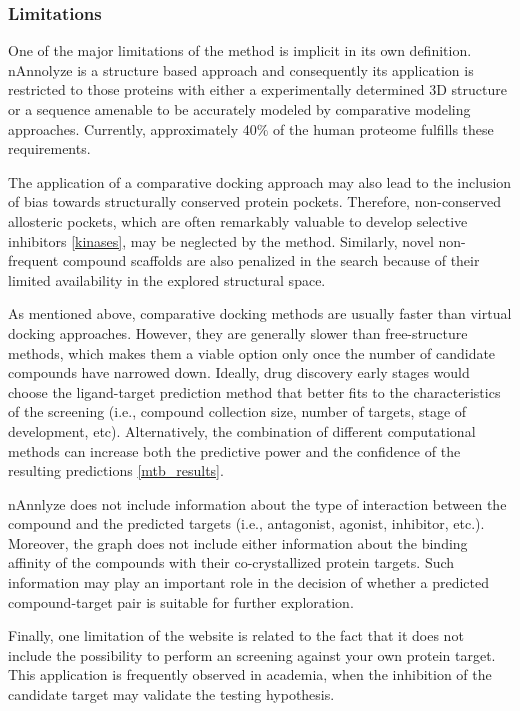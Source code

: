 \documentclass[11pt, b5paper,twoside]{tesi_upf}
\begin{document}
\subsubsection{Limitations}
 \par One of the major limitations of the method is implicit in its own definition. nAnnolyze is a structure based approach and consequently its application is restricted to those proteins with either a experimentally determined 3D structure or a sequence amenable to be accurately modeled by comparative modeling approaches. Currently, approximately 40$\%$ of the human proteome fulfills these requirements.
 \par The application of a comparative docking approach may also lead to the inclusion of bias towards structurally conserved protein pockets. Therefore, non-conserved allosteric pockets, which are often remarkably valuable to develop selective inhibitors \ref{kinases}, may be neglected by the method. Similarly, novel non-frequent compound scaffolds are also penalized in the search because of their limited availability in the explored structural space. 
 \par As mentioned above, comparative docking methods are usually faster than virtual docking approaches. However, they are generally slower than free-structure methods, which makes them a viable option only once the number of candidate compounds have narrowed down. Ideally, drug discovery early stages would choose the ligand-target prediction method that better fits to the characteristics of the screening (i.e., compound collection size, number of targets, stage of development, etc). Alternatively, the combination of different computational methods can increase both the predictive power and the confidence of the resulting predictions \ref{mtb_results}. 
 \par nAnnlyze does not include information about the type of interaction between the compound and the predicted targets (i.e., antagonist, agonist, inhibitor, etc.). Moreover, the graph does not include either information about the binding affinity of the compounds with their co-crystallized protein targets. Such information may play an important role in the decision of whether a predicted compound-target pair is suitable for further exploration. 
  
 \par Finally, one limitation of the website is related to the fact that it does not include the possibility to perform an screening against your own protein target. This application is frequently observed in academia, when the inhibition of the candidate target may validate the testing hypothesis. 
\end{document}
